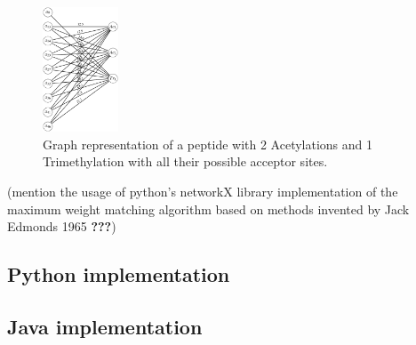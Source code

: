\documentclass{bioinfo}
\begin{document}
\begin{methods}
\begin{figure}[!tpb]%
	\centerline{\includegraphics[width=0.2\textwidth]{pmmp_model.eps}}
	\caption{Graph representation of a peptide with 2 Acetylations and 1 Trimethylation with all their possible acceptor sites.}\label{fig:PMMP_model}
\end{figure}

(mention the usage of python's networkX library implementation of the maximum weight matching algorithm based on methods invented by Jack Edmonds 1965 \textbf{???})

\subsection{Python implementation}

\subsection{Java implementation}








\end{methods}
\end{document}
